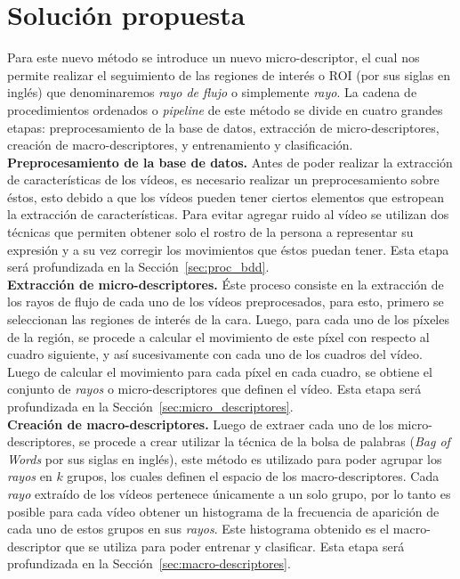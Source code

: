 \section{Solución propuesta}
\label{sec:solucion}

Para este nuevo método se introduce un nuevo micro-descriptor, el cual nos permite realizar el seguimiento de las regiones de interés o ROI (por sus siglas en inglés) que denominaremos \textit{rayo de flujo} o simplemente \textit{rayo}.
La cadena de procedimientos ordenados o \textit{pipeline} de este método se divide en cuatro grandes etapas: preprocesamiento de la base de datos, extracción de micro-descriptores, creación de macro-descriptores, y entrenamiento y clasificación.\\


\textbf{Preprocesamiento de la base de datos.}
Antes de poder realizar la extracción de características de los vídeos, es necesario realizar un preprocesamiento sobre éstos, esto debido a que los vídeos pueden tener ciertos elementos que estropean la extracción de características. Para evitar agregar ruido al vídeo se utilizan dos técnicas que permiten obtener solo el rostro de la persona a representar su expresión y a su vez corregir los movimientos que éstos puedan tener. Esta etapa será profundizada en la Sección~\ref{sec:proc_bdd}.\\


\textbf{Extracción de micro-descriptores.}
Éste proceso consiste en la extracción de los rayos de flujo de cada uno de los vídeos preprocesados, para esto, primero se seleccionan las regiones de interés de la cara. Luego, para cada uno de los píxeles de la región, se procede a calcular el movimiento de este píxel con respecto al cuadro siguiente, y así sucesivamente con cada uno de los cuadros del vídeo. Luego de calcular el movimiento para cada píxel en cada cuadro, se obtiene el conjunto de \textit{rayos} o micro-descriptores que definen el vídeo. Esta etapa será profundizada en la Sección~\ref{sec:micro_descriptores}.\\


\textbf{Creación de macro-descriptores.}
Luego de extraer cada uno de los micro-descriptores, se procede a crear utilizar la técnica de la bolsa de palabras (\textit{Bag of Words} por sus siglas en inglés), este método es utilizado para poder agrupar los \textit{rayos} en $k$ grupos, los cuales definen el espacio de los macro-descriptores. Cada \textit{rayo} extraído de los vídeos pertenece únicamente a un solo grupo, por lo tanto es posible para cada vídeo obtener un histograma de la frecuencia de aparición de cada uno de estos grupos en sus \textit{rayos}. Este histograma obtenido es el macro-descriptor que se utiliza para poder entrenar y clasificar. Esta etapa será profundizada en la Sección~\ref{sec:macro-descriptores}.\\


